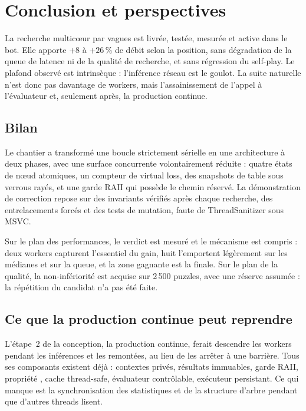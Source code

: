 \section{Conclusion et perspectives}
\label{sec:conclusion}

\begin{resume}
La recherche multic\oe{}ur par vagues est livr\'ee, test\'ee, mesur\'ee et
active dans le bot. Elle apporte $+8$ \`a $+26\,\%$ de d\'ebit selon la
position, sans d\'egradation de la queue de latence ni de la qualit\'e de
recherche, et sans r\'egression du self-play. Le plafond observ\'e est
intrins\`eque : l'inf\'erence r\'eseau est le goulot. La suite naturelle n'est
donc pas davantage de workers, mais l'assainissement de l'appel \`a
l'\'evaluateur et, seulement apr\`es, la production continue.
\end{resume}

\subsection{Bilan}

Le chantier a transform\'e une boucle strictement s\'erielle en une
architecture \`a deux phases, avec une surface concurrente volontairement
r\'eduite : quatre \'etats de n\oe{}ud atomiques, un compteur de virtual loss,
des snapshots de table sous verrous ray\'es, et une garde RAII qui poss\`ede
le chemin r\'eserv\'e. La d\'emonstration de correction repose sur des
invariants v\'erifi\'es apr\`es chaque recherche, des entrelacements forc\'es
et des tests de mutation, faute de ThreadSanitizer sous MSVC.

Sur le plan des performances, le verdict est mesur\'e et le m\'ecanisme est
compris : deux workers capturent l'essentiel du gain, huit l'emportent
l\'eg\`erement sur les m\'edianes et sur la queue, et la zone gagnante est la
finale. Sur le plan de la qualit\'e, la non-inf\'eriorit\'e est acquise sur
2\,500 puzzles, avec une r\'eserve assum\'ee : la r\'ep\'etition du candidat
n'a pas \'et\'e faite.

\subsection{Ce que la production continue peut reprendre}

L'\'etape~2 de la conception, la production continue, ferait descendre les
workers pendant les inf\'erences et les remont\'ees, au lieu de les arr\^eter
\`a une barri\`ere. Tous ses composants existent d\'ej\`a : contextes priv\'es,
r\'esultats immuables, garde RAII, propri\'et\'e , cache
thread-safe, \'evaluateur contr\^olable, ex\'ecuteur persistant. Ce qui
manque est la synchronisation des statistiques et de la structure d'arbre
pendant que d'autres threads lisent.

